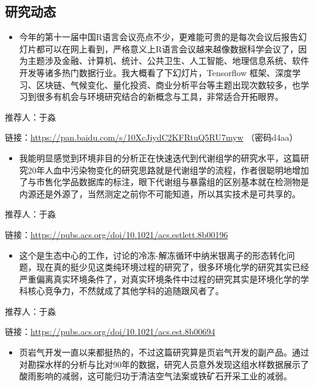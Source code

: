 \documentclass[]{book}
\providecommand{\tightlist}{%
  \setlength{\itemsep}{0pt}\setlength{\parskip}{0pt}}
\begin{document}
\hypertarget{ux7814ux7a76ux52a8ux6001-7}{%
\subsection*{研究动态}\label{ux7814ux7a76ux52a8ux6001-7}}

\begin{itemize}
\tightlist
\item
  今年的第十一届中国R语言会议亮点不少，更难能可贵的是每次会议后报告幻灯片都可以在网上看到，严格意义上R语言会议越来越像数据科学会议了，因为主题涉及金融、计算机、统计、公共卫生、人工智能、地理信息系统、软件开发等诸多热门数据行业。我大概看了下幻灯片，Tensorflow 框架、深度学习、区块链、气候变化、量化投资、商业分析平台等主题出现次数较多，也学习到很多有机会与环境研究结合的新概念与工具，非常适合开拓眼界。
\end{itemize}

推荐人：于淼

链接：\url{https://pan.baidu.com/s/10XcJiydC2KFRtuQ5RU7myw} （密码d4aa）

\begin{itemize}
\tightlist
\item
  我能明显感觉到环境非目的分析正在快速迭代到代谢组学的研究水平，这篇研究20年人血中污染物变化的研究思路就是代谢组学的流程，作者很聪明地增加了与市售化学品数据库的标注，眼下代谢组与暴露组的区别基本就在检测物是内源还是外源了，当然测定之前你不可能知道，所以其实技术是可共享的。
\end{itemize}

推荐人：于淼

链接：\url{https://pubs.acs.org/doi/10.1021/acs.estlett.8b00196}

\begin{itemize}
\tightlist
\item
  这个是生态中心的工作，讨论的冷冻-解冻循环中纳米银离子的形态转化问题，现在真的挺少见这类纯环境过程的研究了，很多环境化学的研究其实已经严重偏离真实环境条件了，对真实环境条件中过程的研究其实是环境化学的学科核心竞争力，不然就成了其他学科的追随跟风者了。
\end{itemize}

推荐人：于淼

链接：\url{https://pubs.acs.org/doi/10.1021/acs.est.8b00694}

\begin{itemize}
\tightlist
\item
  页岩气开发一直以来都挺热的，不过这篇研究算是页岩气开发的副产品。通过对勘探水样的分析与比对90年的数据，研究人员意外发现这组水样数据展示了酸雨影响的减弱，这可能归功于清洁空气法案或铁矿石开采工业的减弱。
\end{itemize}
\end{document}

